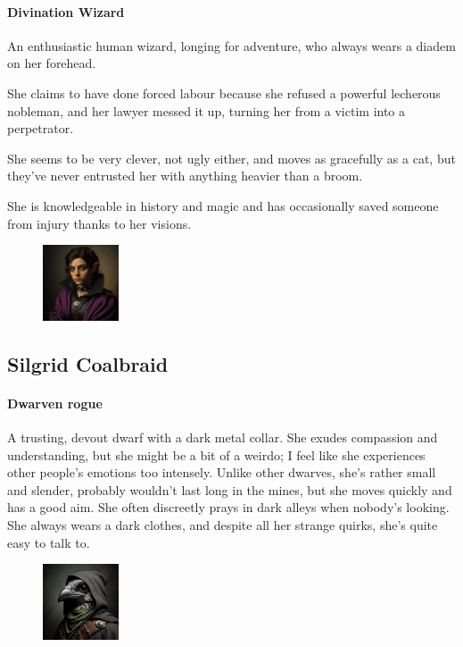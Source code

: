 \documentclass[10pt,onecolumn,twoside,openany,bg=full,layout=true]{dndbook}
\begin{document}
  \paragraph{Divination Wizard}
  An enthusiastic human wizard, longing for adventure, who always wears a diadem on her forehead.\par
  She claims to have done forced labour because she refused a powerful lecherous nobleman, and her lawyer messed it up,
  turning her from a victim into a perpetrator.\par
  She seems to be very clever, not ugly either, and moves as gracefully as a cat, but they've never entrusted her
  with anything heavier than a broom.\par
  She is knowledgeable in history and magic and has occasionally saved someone from injury thanks to her visions.

  \begin{figure}
    \begin{center}
      \includegraphics[width=0.2\textwidth]{img/silgrid}
    \end{center}
  \end{figure}
  \subsection{Silgrid Coalbraid}\label{subsec:silgrid-coalbraid}
  \paragraph{Dwarven rogue} A trusting, devout dwarf with a dark metal collar.
  She exudes compassion and understanding, but she might be a bit of a weirdo; I feel like she experiences other
  people's emotions too intensely.
  Unlike other dwarves, she's rather small and slender, probably wouldn't last long
  in the mines, but she moves quickly and has a good aim.
  She often discreetly prays in dark alleys when nobody's looking.
  She always wears a dark clothes, and despite all her strange quirks, she's quite easy to talk to.

  \begin{figure}
    \begin{center}
      \includegraphics[width=0.2\textwidth]{img/sally}
    \end{center}
  \end{figure}
\end{document}
